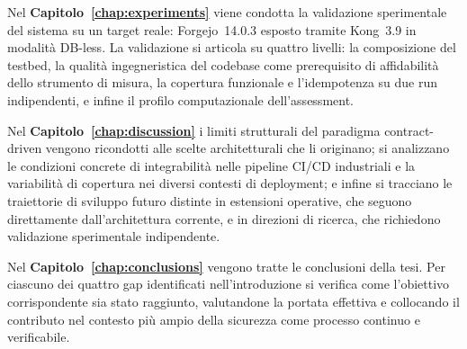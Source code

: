 Nel \textbf{Capitolo~\ref{chap:experiments}} viene condotta la validazione sperimentale del sistema su un target reale: Forgejo~14.0.3 esposto tramite Kong~3.9 in modalità DB-less. La validazione si articola su quattro livelli: la composizione del testbed, la qualità ingegneristica del codebase come prerequisito di affidabilità dello strumento di misura, la copertura funzionale e l'idempotenza su due run indipendenti, e infine il profilo computazionale dell'assessment.

Nel \textbf{Capitolo~\ref{chap:discussion}} i limiti strutturali del paradigma contract-driven vengono ricondotti alle scelte architetturali che li originano; si analizzano le condizioni concrete di integrabilità nelle pipeline \gls{CI/CD} industriali e la variabilità di copertura nei diversi contesti di deployment; e infine si tracciano le traiettorie di sviluppo futuro distinte in estensioni operative, che seguono direttamente dall'architettura corrente, e in direzioni di ricerca, che richiedono validazione sperimentale indipendente.

Nel \textbf{Capitolo~\ref{chap:conclusions}} vengono tratte le conclusioni della tesi. Per ciascuno dei quattro gap identificati nell'introduzione si verifica come l'obiettivo corrispondente sia stato raggiunto, valutandone la portata effettiva e collocando il contributo nel contesto più ampio della sicurezza come processo continuo e verificabile.